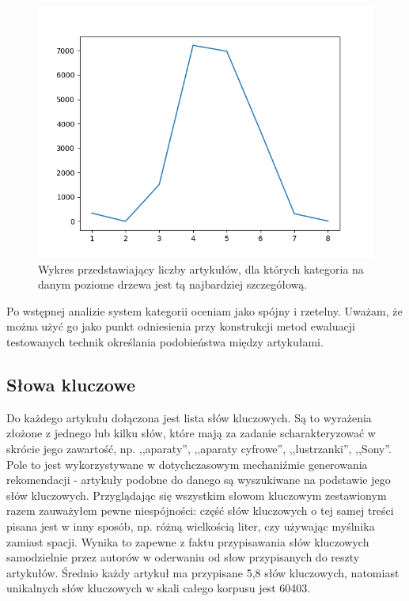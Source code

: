 \documentclass[pl]{minipw} %
\begin{document}
\begin{figure}[H]
	\centering
	\includegraphics[width=1\textwidth]{img/cat_art_levels.png}
	\caption{Wykres przedstawiający liczby artykułów, dla których kategoria na danym poziome drzewa jest tą najbardziej szczegółową.}
\end{figure}
Po wstępnej analizie system kategorii oceniam jako spójny i rzetelny. Uważam, że można użyć go jako punkt odniesienia przy konstrukcji metod ewaluacji testowanych technik określania podobieństwa między artykułami.
\subsection{Słowa kluczowe}
Do każdego artykułu dołączona jest lista słów kluczowych. Są to wyrażenia złożone z jednego lub kilku słów, które mają za zadanie scharakteryzować w skrócie jego zawartość, np. ,,aparaty'', ,,aparaty cyfrowe'', ,,lustrzanki'', ,,Sony''. Pole to jest wykorzystywane w dotychczasowym mechaniźmie generowania rekomendacji - artykuły podobne do danego są wyszukiwane na podstawie jego słów kluczowych. Przyglądając się wszystkim słowom kluczowym zestawionym razem zauważyłem pewne niespójności: część słów kluczowych o tej samej treści pisana jest w inny sposób, np. różną wielkością liter, czy używając myślnika zamiast spacji. Wynika to zapewne z faktu przypisawania słów kluczowych samodzielnie przez autorów w oderwaniu od słow przypisanych do reszty artykułów. Średnio każdy artykuł ma przypisane 5,8 słów kluczowych, natomiast unikalnych słów kluczowych w skali całego korpusu jest 60403.
\end{document}
